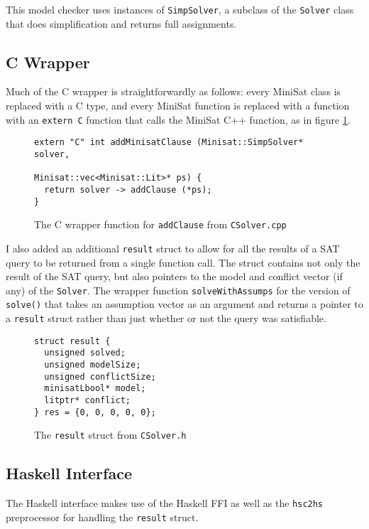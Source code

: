 \documentclass[12pt,a4paper,twoside,openright]{report}
\begin{document}
{This model checker uses instances of \verb,SimpSolver,, a subclass of the \verb,Solver, class
that does simplification and returns full assignments.

\subsection{C Wrapper}

Much of the C wrapper is straightforwardly as follows: every MiniSat class is replaced with a C
type, and every MiniSat function is replaced with a function with an \verb,extern C, function that
calls the MiniSat C++ function, as in figure \ref{addClause}.

\begin{figure}[h]
\begin{verbatim}
extern "C" int addMinisatClause (Minisat::SimpSolver* solver,
                                 Minisat::vec<Minisat::Lit>* ps) {
  return solver -> addClause (*ps);
}
\end{verbatim}
\caption{The C wrapper function for {\tt addClause} from {\tt CSolver.cpp}}
\label{addClause}
\end{figure}

I also added an additional \verb,result, struct to allow for all the results of a SAT query to
be returned from a single function call. The struct contains not only the result of the SAT
query, but also pointers to the model and conflict vector (if any) of the \verb,Solver,.
The wrapper function \verb,solveWithAssumps, for the version of \verb,solve(), that takes an assumption
vector as an argument and returns a pointer to a \verb,result, struct
rather than just whether or not the query was satisfiable.

\begin{figure}[h]
\begin{verbatim}
struct result {
  unsigned solved;
  unsigned modelSize;
  unsigned conflictSize;
  minisatLbool* model;
  litptr* conflict;
} res = {0, 0, 0, 0, 0};
\end{verbatim}
\caption{The {\tt result} struct from {\tt CSolver.h}}
\end{figure}

\subsection{Haskell Interface}

The Haskell interface makes use of the Haskell FFI as well as the \verb,hsc2hs, preprocessor
for handling the \verb,result, struct.

}
\end{document}
